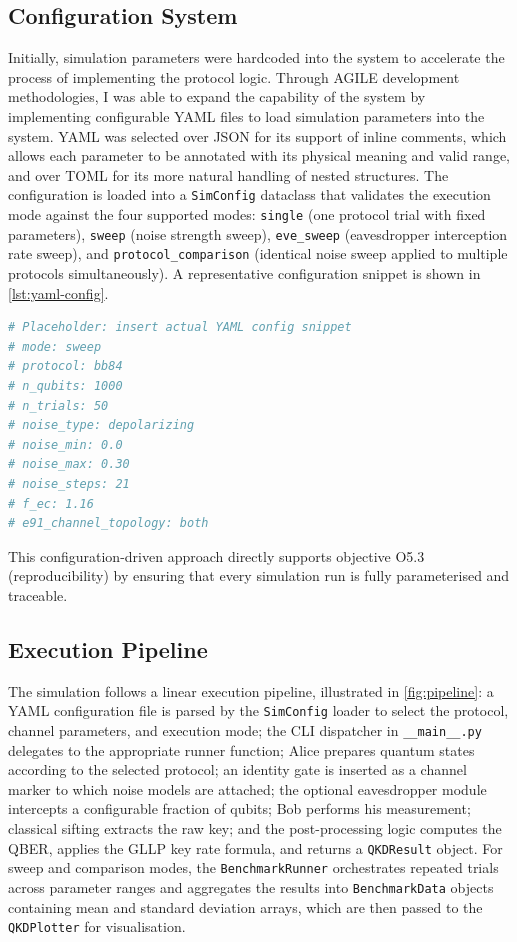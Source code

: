 \documentclass[10pt, a4paper]{report}
\begin{document}
\subsection{Configuration System}
Initially, simulation parameters were hardcoded into the system to accelerate the process of implementing the protocol logic. Through AGILE development methodologies, I was able to expand the capability of the system by implementing configurable YAML files to load simulation parameters into the system. YAML was selected over JSON for its support of inline comments, which allows each parameter to be annotated with its physical meaning and valid range, and over TOML for its more natural handling of nested structures. The configuration is loaded into a \texttt{SimConfig} dataclass that validates the execution mode against the four supported modes: \texttt{single} (one protocol trial with fixed parameters), \texttt{sweep} (noise strength sweep), \texttt{eve\_sweep} (eavesdropper interception rate sweep), and \texttt{protocol\_comparison} (identical noise sweep applied to multiple protocols simultaneously). A representative configuration snippet is shown in \cref{lst:yaml-config}.

\begin{lstlisting}[language=Python, caption={Example YAML configuration for a BB84 noise sweep}, label={lst:yaml-config}]
# Placeholder: insert actual YAML config snippet
# mode: sweep
# protocol: bb84
# n_qubits: 1000
# n_trials: 50
# noise_type: depolarizing
# noise_min: 0.0
# noise_max: 0.30
# noise_steps: 21
# f_ec: 1.16
# e91_channel_topology: both
\end{lstlisting}

This configuration-driven approach directly supports objective O5.3 (reproducibility) by ensuring that every simulation run is fully parameterised and traceable.

\subsection{Execution Pipeline}

The simulation follows a linear execution pipeline, illustrated in \cref{fig:pipeline}: a YAML configuration file is parsed by the \texttt{SimConfig} loader to select the protocol, channel parameters, and execution mode; the CLI dispatcher in \texttt{\_\_main\_\_.py} delegates to the appropriate runner function; Alice prepares quantum states according to the selected protocol; an identity gate is inserted as a channel marker to which noise models are attached; the optional eavesdropper module intercepts a configurable fraction of qubits; Bob performs his measurement; classical sifting extracts the raw key; and the post-processing logic computes the QBER, applies the GLLP key rate formula, and returns a \texttt{QKDResult} object. For sweep and comparison modes, the \texttt{BenchmarkRunner} orchestrates repeated trials across parameter ranges and aggregates the results into \texttt{BenchmarkData} objects containing mean and standard deviation arrays, which are then passed to the \texttt{QKDPlotter} for visualisation.
\end{document}
